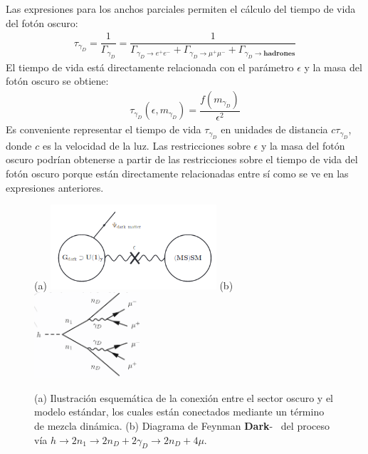 Las expresiones para los anchos parciales permiten el cálculo del tiempo de vida del fotón oscuro:
\begin{eqnarray}
\label{an-15-455:ec6}
\tau_{\gamma_D} = \dfrac{1}{\Gamma_{\gamma_D}} =\dfrac{1}{\Gamma_{\gamma_D \rightarrow e^+ e^-} + \Gamma_{\gamma_D \rightarrow \mu^+ \mu^-} + \Gamma_{\gamma_D \rightarrow \mathbf{hadrones}}}
\end{eqnarray}
El tiempo de vida está directamente relacionada con el parámetro $\epsilon$ y la masa del fotón oscuro se obtiene:
\begin{eqnarray}
\label{an-15-455:ec7}
\tau_{\gamma_D}(\epsilon,m_{\gamma_D}) =\dfrac{f(m_{\gamma_D})}{\epsilon^2} 
\end{eqnarray}
Es conveniente representar el tiempo de vida $\tau_{\gamma_D}$ en unidades de distancia $c\tau_{\gamma_D}$, donde $c$ es la velocidad de la luz. %
Las restricciones sobre $\epsilon$ y la masa del fotón oscuro podrían obtenerse a partir de las restricciones sobre el tiempo de vida del fotón oscuro porque están directamente relacionadas entre sí como se ve en las expresiones anteriores.


\begin{figure}[!t]
    \centering
    (a)
    \includegraphics[width=0.55\textwidth]{Cap1/imagenes/sketch_darksector.png}
    (b)
    \includegraphics[width=0.35\textwidth]{Cap1/imagenes/darksusy_feynman.png}
    \caption{(a) Ilustración esquemática de la conexión entre el sector oscuro y el modelo estándar, los cuales están conectados mediante un término de mezcla dinámica. (b) Diagrama de Feynman \textbf{Dark}-\SUSY ~ del proceso vía $h \rightarrow 2n_1 \rightarrow 2n_D + 2\gamma_D \rightarrow 2n_D + 4\mu$.}
    \label{fig:sketch_darksector}
\end{figure}

